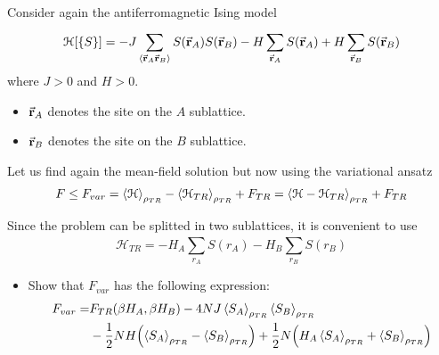 \documentclass[../main/main.tex]{subfiles}
\begin{document}
\begin{exercise}
Consider again the antiferromagnetic Ising model
\begin{equation}
  \mathcal{H}[\{ S \}  ] = - J \sum_{\expval{\va{r}_A \va{r}_B} }^{} S (\va{r}_A) S(\va{r}_B) - H \sum_{\va{r}_A}^{} S (\va{r}_A) + H \sum_{\va{r}_B}^{} S (\va{r}_B)
\end{equation}
where \( J>0 \) and \( H>0 \).
\begin{itemize}
\item \( \va{r}_A \) denotes the site on the \( A \) sublattice.
\item \( \va{r}_B \) denotes the site on the \( B \) sublattice.
\end{itemize}

Let us find again the mean-field solution but now using the variational ansatz
\begin{equation}
  F \le F_{var} = \expval{\mathcal{H}}_{\rho _{TR}} - \expval{\mathcal{H}_{TR} }_{\rho _{TR}}  + F_{TR} = \expval{\mathcal{H} - \mathcal{H}_{TR}}_{\rho _{TR}} + F_{TR}
\end{equation}
\begin{remark}
  Since the problem can be splitted in two sublattices, it is convenient to use
  \begin{equation}
    \mathcal{H}_{TR} = - H_A \sum_{r_A}^{} S(r_A) - H_B \sum_{r_B}^{}  S(r_B)
  \end{equation}
\end{remark}

\begin{itemize}
\item Show that \( F_{var} \) has the following expression:
\begin{equation}
\begin{split}
F_{var}  = &  F_{TR} (\beta H_A, \beta H_B)
- 4 NJ \expval{S_A}_{\rho _{TR}}  \expval{S_B}_{\rho _{TR}} \\
 &- \frac{1}{2} NH \qty(\expval{S_A}_{\rho _{TR}}
 - \expval{S_B}_{\rho _{TR}}   )
 + \frac{1}{2} N \qty(H_A \expval{S_A}_{\rho _{TR}}  + \expval{S_B}_{\rho _{TR}}   )
\end{split}
\end{equation}


\end{itemize}
\end{exercise}
\end{document}
